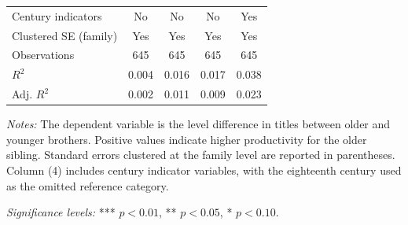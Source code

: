 \begin{table}[H]
\begin{tablebody}
\begin{tabular}{lcccc}
\midrule
Century indicators 
& No 
& No 
& No 
& Yes \\

Clustered SE (family) & Yes & Yes & Yes & Yes \\
\midrule

Observations 
& 645 
& 645 
& 645 
& 645 \\

$R^2$ 
& 0.004 
& 0.016 
& 0.017 
& 0.038 \\

Adj. $R^2$ 
& 0.002 
& 0.011 
& 0.009 
& 0.023 \\

\bottomrule
\end{tabular}
\end{tablebody}

\vspace{4pt}
\begin{minipage}{\textwidth}
\footnotesize
\textit{Notes:} The dependent variable is the level difference in titles between older and younger brothers. Positive values indicate higher productivity for the older sibling. Standard errors clustered at the family level are reported in parentheses. Column (4) includes century indicator variables, with the eighteenth century used as the omitted reference category.

\textit{Significance levels:} *** $p<0.01$, ** $p<0.05$, * $p<0.10$.
\end{minipage}

\end{table}